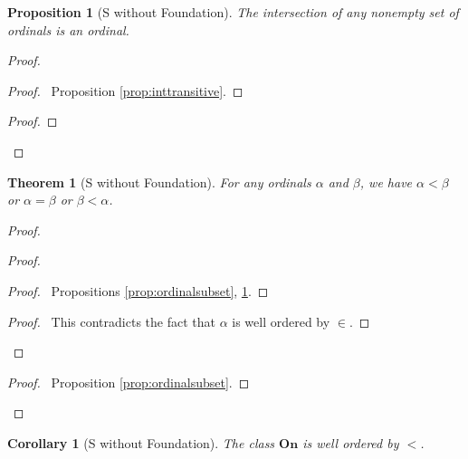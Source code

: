 \documentclass{book}
\let\qed\relax
\newtheorem{prop}[ax]{Proposition}
\newtheorem{cor}{Corollary}[ax]
\newtheorem{thm}[ax]{Theorem}
\theoremstyle{definition}
\begin{document}
\begin{prop}[S without Foundation]
\label{prop:intordinal}
The intersection of any nonempty set of ordinals is an ordinal.
\end{prop}

\begin{proof}
\pf
{}
\begin{proof}
	\pf\ Proposition \ref{prop:inttransitive}.
\end{proof}
\begin{proof}
\end{proof}
\qed
\end{proof}

\begin{thm}[S without Foundation]
\label{thm:ordinaltrichotomy}
For any ordinals $\alpha$ and $\beta$, we have $\alpha < \beta$ or $\alpha = \beta$ or $\beta < \alpha$.
\end{thm}

\begin{proof}
\pf
{}
\begin{proof}
	\begin{proof}
		\pf\ Propositions \ref{prop:ordinalsubset}, \ref{prop:intordinal}.
	\end{proof}
	\qedstep
	\begin{proof}
		\pf\ This contradicts the fact that $\alpha$ is well ordered by $\in$.
	\end{proof}
\end{proof}
\begin{proof}
	\pf\ Proposition \ref{prop:ordinalsubset}.
\end{proof}
\qed
\end{proof}

\begin{cor}[S without Foundation]
The class $\mathbf{On}$ is well ordered by $<$.
\end{cor}
\end{document}
